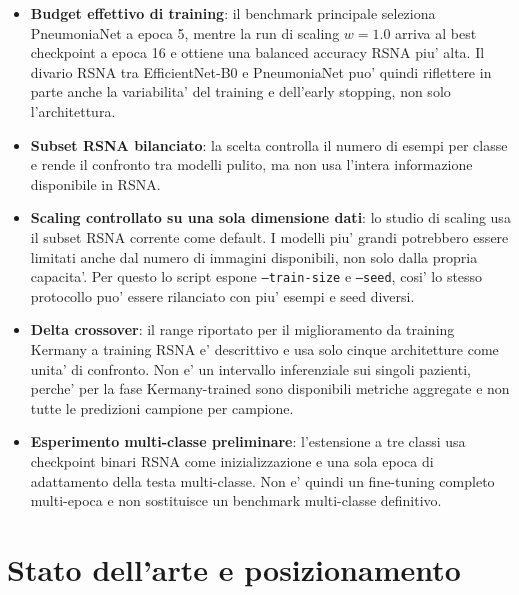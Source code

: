 \documentclass[11pt,a4paper]{article}
\newcommand{\balacc}{balanced accuracy}
\begin{document}
\begin{itemize}
  stati eseguiti con un seed controllato, ma non sono state ripetute run
  complete multi-seed per stimare la variabilita' del training. Questa
  limitazione e' particolarmente importante nello studio di scaling: sulle
  valutazioni esterne le oscillazioni tra punti della curva sono paragonabili
  all'effetto della capacita', quindi non vanno lette come trend architetturali
  definitivi.
  \item \textbf{Budget effettivo di training}: il benchmark principale seleziona
  PneumoniaNet a epoca 5, mentre la run di scaling \(w=1.0\) arriva al best
  checkpoint a epoca 16 e ottiene una \balacc{} RSNA piu' alta. Il divario RSNA
  tra EfficientNet-B0 e PneumoniaNet puo' quindi riflettere in parte anche la
  variabilita' del training e dell'early stopping, non solo l'architettura.
  \item \textbf{Subset RSNA bilanciato}: la scelta controlla il numero di esempi
  per classe e rende il confronto tra modelli pulito, ma non usa l'intera
  informazione disponibile in RSNA.
  \item \textbf{Scaling controllato su una sola dimensione dati}: lo studio di
  scaling usa il subset RSNA corrente come default. I modelli piu' grandi
  potrebbero essere limitati anche dal numero di immagini disponibili, non solo
  dalla propria capacita'. Per questo lo script espone \texttt{--train-size} e
  \texttt{--seed}, cosi' lo stesso protocollo puo' essere rilanciato con piu'
  esempi e seed diversi.
  \item \textbf{Delta crossover}: il range riportato per il miglioramento da
  training Kermany a training RSNA e' descrittivo e usa solo cinque architetture
  come unita' di confronto. Non e' un intervallo inferenziale sui singoli
  pazienti, perche' per la fase Kermany-trained sono disponibili metriche
  aggregate e non tutte le predizioni campione per campione.
  \item \textbf{Esperimento multi-classe preliminare}: l'estensione a tre classi
  usa checkpoint binari RSNA come inizializzazione e una sola epoca di
  adattamento della testa multi-classe. Non e' quindi un fine-tuning completo
  multi-epoca e non sostituisce un benchmark multi-classe definitivo.
\end{itemize}

\section{Stato dell'arte e posizionamento}
\end{document}

